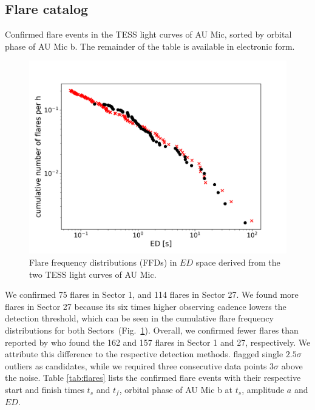 \documentclass[fleqn,usenatbib,letters]{mnras}%
\begin{document}
\subsection{Flare catalog}
\label{sec:flarecatalog}
\begin{table}
\caption{Confirmed flare events in the TESS light curves of AU Mic, sorted by orbital phase of AU Mic b. The remainder of the table is available in electronic form.}
\centering

\label{tab:flares}
\end{table}

\begin{figure}
\includegraphics[width=\hsize]{figures/2021_06_11_ffd.png} 
\caption{Flare frequency distributions (FFDs) in $ED$ space derived from the two TESS light curves of AU Mic.}
\label{fig:ffd}
\end{figure}
We confirmed 75 flares in Sector 1, and 114 flares in Sector 27. We found more flares in Sector 27 because its six times higher observing cadence lowers the detection threshold, which can be seen in the cumulative flare frequency distributions for both Sectors~(Fig.~\ref{fig:ffd}). Overall, we confirmed fewer flares than reported by \citet{martioli2021} who found the 162 and 157 flares in Sector 1 and 27, respectively. We attribute this difference to the respective detection methods. \citet{martioli2021} flagged single $2.5\sigma$ outliers as candidates, while we required three consecutive data points $3\sigma$ above the noise. Table \ref{tab:flares} lists the confirmed flare events with their respective start and finish times $t_s$ and $t_f$, orbital phase of AU Mic b at $t_s$, amplitude $a$ and $ED$.
\end{document}
